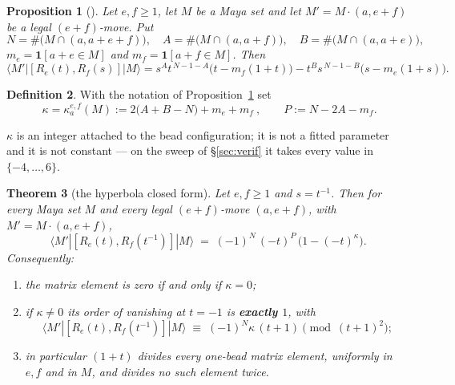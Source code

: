 \documentclass[11pt]{article}
\newtheorem{theorem}{Theorem}[section]
\newtheorem{proposition}[theorem]{Proposition}
\theoremstyle{definition}
\newtheorem{definition}[theorem]{Definition}
\begin{document}
\begin{proposition}[{\cite[Thm.~4.1(1)]{Q96}}]\label{prop:q96}
Let $e,f\ge1$, let $M$ be a Maya set and let $M'=M\cdot(a,e+f)$ be a legal $(e{+}f)$-move.
Put
\[
 N=\#\bigl(M\cap(a,a+e+f)\bigr),\quad A=\#\bigl(M\cap(a,a+f)\bigr),\quad
 B=\#\bigl(M\cap(a,a+e)\bigr),
\]
$m_e=\mathbf 1[a+e\in M]$ and $m_f=\mathbf 1[a+f\in M]$.  Then
\[
  \langle M'|[R_e(t),R_f(s)]|M\rangle
  = s^{A}t^{\,N-1-A}\bigl(t-m_f(1+t)\bigr)-t^{B}s^{\,N-1-B}\bigl(s-m_e(1+s)\bigr).
\]
\end{proposition}

\begin{definition}\label{def:kappa}
With the notation of Proposition~\ref{prop:q96} set
\[
  \boxed{\ \kappa=\kappa^{e,f}_{a}(M):=2\bigl(A+B-N\bigr)+m_e+m_f\ },
  \qquad P:=N-2A-m_f .
\]
\end{definition}

$\kappa$ is an integer attached to the bead configuration; it is not a fitted parameter and
it is not constant --- on the sweep of \S\ref{sec:verif} it takes every value in
$\{-4,\dots,6\}$.

\begin{theorem}[the hyperbola closed form]\label{thm:A}
Let $e,f\ge1$ and $s=t^{-1}$.  Then for every Maya set $M$ and every legal
$(e{+}f)$-move $(a,e+f)$, with $M'=M\cdot(a,e+f)$,
\[
  \boxed{\ \langle M'|[R_e(t),R_f(t^{-1})]|M\rangle
  \;=\;(-1)^{N}\,(-t)^{P}\,\bigl(1-(-t)^{\kappa}\bigr).\ }
\]
Consequently:
\begin{enumerate}
\item[(i)] the matrix element is zero if and only if $\kappa=0$;
\item[(ii)] if $\kappa\neq0$ its order of vanishing at $t=-1$ is \textbf{exactly $1$}, with
\[
  \langle M'|[R_e(t),R_f(t^{-1})]|M\rangle\;\equiv\;(-1)^{N}\kappa\,(t+1)
  \pmod{(t+1)^{2}} ;
\]
\item[(iii)] in particular $(1+t)$ divides every one-bead matrix element, uniformly in
$e,f$ and in $M$, and divides no such element twice.
\end{enumerate}
\end{theorem}
\end{document}
